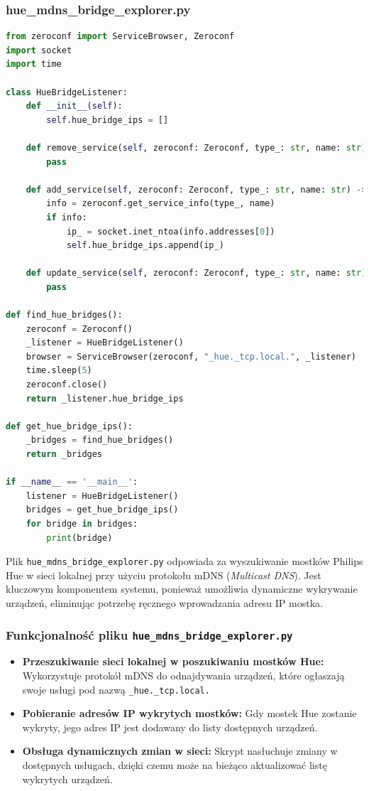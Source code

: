 \documentclass[12pt]{article}
\begin{document}
\subsubsection{hue\_mdns\_bridge\_explorer.py}
\begin{lstlisting}[language=Python]
from zeroconf import ServiceBrowser, Zeroconf
import socket
import time

class HueBridgeListener:
    def __init__(self):
        self.hue_bridge_ips = []

    def remove_service(self, zeroconf: Zeroconf, type_: str, name: str) -> None:
        pass

    def add_service(self, zeroconf: Zeroconf, type_: str, name: str) -> None:
        info = zeroconf.get_service_info(type_, name)
        if info:
            ip_ = socket.inet_ntoa(info.addresses[0])
            self.hue_bridge_ips.append(ip_)

    def update_service(self, zeroconf: Zeroconf, type_: str, name: str) -> None:
        pass

def find_hue_bridges():
    zeroconf = Zeroconf()
    _listener = HueBridgeListener()
    browser = ServiceBrowser(zeroconf, "_hue._tcp.local.", _listener)
    time.sleep(5)
    zeroconf.close()
    return _listener.hue_bridge_ips

def get_hue_bridge_ips():
    _bridges = find_hue_bridges()
    return _bridges

if __name__ == '__main__':
    listener = HueBridgeListener()
    bridges = get_hue_bridge_ips()
    for bridge in bridges:
        print(bridge)
\end{lstlisting}

Plik \texttt{hue\_mdns\_bridge\_explorer.py} odpowiada za wyszukiwanie mostków Philips Hue w sieci lokalnej przy użyciu protokołu mDNS (\textit{Multicast DNS}).
Jest kluczowym komponentem systemu, ponieważ umożliwia dynamiczne wykrywanie urządzeń, eliminując potrzebę ręcznego wprowadzania adresu IP mostka.

\subsubsection*{Funkcjonalność pliku \texttt{hue\_mdns\_bridge\_explorer.py}}
\begin{itemize}
    \item \textbf{Przeszukiwanie sieci lokalnej w poszukiwaniu mostków Hue:} Wykorzystuje protokół mDNS do odnajdywania urządzeń, które ogłaszają swoje usługi pod nazwą
    \texttt{\_hue.\_tcp.local.}
    \item \textbf{Pobieranie adresów IP wykrytych mostków:} Gdy mostek Hue zostanie wykryty, jego adres IP jest dodawany do listy dostępnych urządzeń.
    \item \textbf{Obsługa dynamicznych zmian w sieci:} Skrypt nasłuchuje zmiany w dostępnych usługach, dzięki czemu może na bieżąco aktualizować listę wykrytych urządzeń.
\end{itemize}
\end{document}
